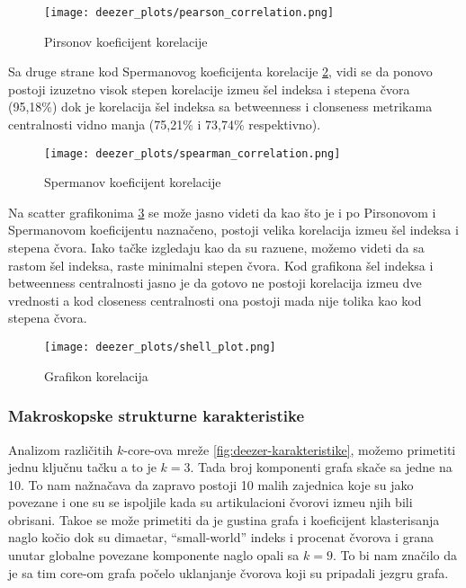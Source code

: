 \documentclass[11pt,a4paper]{article}
\begin{document}
\begin{figure}
    \centering
    \texttt{[image: deezer\_plots/pearson\_correlation.png]}
    \caption{Pirsonov koeficijent korelacije}
    \label{fig:deezer-prison}
\end{figure}

Sa druge strane kod Spermanovog koeficijenta korelacije \ref{fig:deezer-sperman}, vidi se da ponovo postoji izuzetno visok stepen korelacije izme\dj u \v sel indeksa i stepena \v cvora (95,18\%) dok je korelacija \v sel indeksa sa betweenness i clonseness metrikama centralnosti vidno manja (75,21\% i 73,74\% respektivno).

\begin{figure}
    \centering
    \texttt{[image: deezer\_plots/spearman\_correlation.png]}
    \caption{Spermanov koeficijent korelacije}
    \label{fig:deezer-sperman}
\end{figure}

Na scatter grafikonima \ref{fig:deezer-korelacije} se mo\v ze jasno videti da kao \v sto je i po Pirsonovom i Spermanovom koeficijentu nazna\v ceno, postoji velika korelacija izme\dj u \v sel indeksa i stepena \v cvora. Iako ta\v cke izgledaju kao da su razu\dj ene, mo\v zemo videti da sa rastom \v sel indeksa, raste minimalni stepen \v cvora. Kod grafikona \v sel indeksa i betweenness centralnosti jasno je da gotovo ne postoji korelacija izme\dj u dve vrednosti a kod closeness centralnosti ona postoji mada nije tolika kao kod stepena \v cvora.

\begin{figure}
    \centering
    \texttt{[image: deezer\_plots/shell\_plot.png]}
    \caption{Grafikon korelacija}
    \label{fig:deezer-korelacije}
\end{figure}

\subsubsection{Makroskopske strukturne karakteristike}

Analizom razli\v citih $ k $-core-ova mre\v ze \ref{fig:deezer-karakteristike}, mo\v zemo primetiti jednu klju\v cnu ta\v cku a to je $ k = 3 $. Tada broj komponenti grafa ska\v ce sa jedne na 10. To nam na\v zna\v cava da zapravo postoji 10 malih zajednica koje su jako povezane i one su se ispoljile kada su artikulacioni \v cvorovi izme\dj u njih bili obrisani. Tako\dj e se mo\v ze primetiti da je gustina grafa i koeficijent klasterisanja naglo ko\v cio dok su dimaetar, ``small-world'' indeks i procenat \v cvorova i grana unutar globalne povezane komponente naglo opali sa $ k = 9 $. To bi nam zna\v cilo da je sa tim core-om grafa po\v celo uklanjanje \v cvorova koji su pripadali jezgru grafa.
\end{document}

